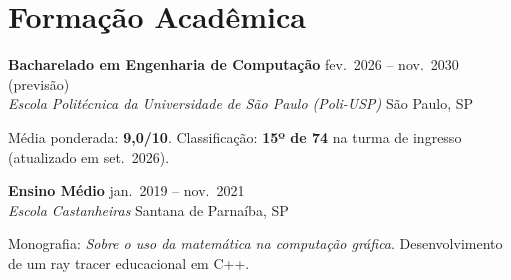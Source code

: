 \documentclass[10pt,a4paper]{article}
\newcommand{\entry}[4]{%
  \textbf{#1} \hfill {\small #3}\\
  {\itshape\color{subgray} #2} \hfill {\small\color{subgray}#4}\par
}
\begin{document}

\section{Formação Acadêmica}

\entry{Bacharelado em Engenharia de Computação}{Escola Politécnica da Universidade de São Paulo (Poli-USP)}{fev.\ 2026 -- nov.\ 2030 (previsão)}{São Paulo, SP}
{\small Média ponderada: \textbf{9,0/10}. Classificação: \textbf{15º de 74} na turma de ingresso (atualizado em set.\ 2026).}\par
\vspace{2pt}
\entry{Ensino Médio}{Escola Castanheiras}{jan.\ 2019 -- nov.\ 2021}{Santana de Parnaíba, SP}
{\small Monografia: \textit{Sobre o uso da matemática na computação gráfica}. Desenvolvimento de um ray tracer educacional em C++.}\par

\end{document}
